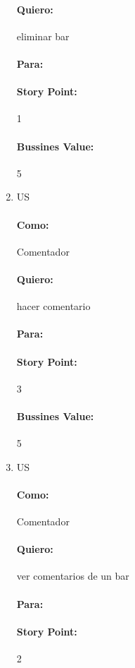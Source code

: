 \documentclass[10pt,a4paper]{article}
\begin{document}
\begin{enumerate}
\paragraph{Quiero:} eliminar bar
\paragraph{Para:}
\paragraph{Story Point:}1 
\paragraph{Bussines Value:}5



 \item US
\paragraph{Como:} Comentador
\paragraph{Quiero:} hacer comentario
\paragraph{Para:}
\paragraph{Story Point:}3
\paragraph{Bussines Value:}5


 \item US
\paragraph{Como:} Comentador
\paragraph{Quiero:}ver comentarios de un bar 
\paragraph{Para:}
\paragraph{Story Point:}2

\end{enumerate}
\end{document}
